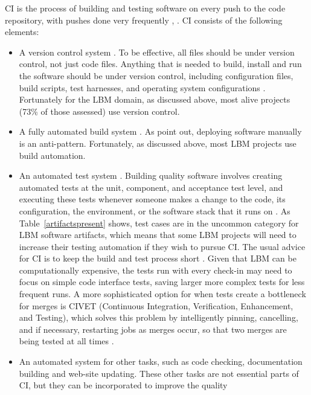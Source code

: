 \documentclass[final, 3p, times, authoryear]{elsarticle}
\begin{document}
CI is the process of building and testing software on every push to the code
repository, with pushes done very frequently \citep[p.\ 13]
{HumbleAndFarley2010}, \citep{ShahinEtAl2017, Fowler2006}.  CI consists of the
following elements:
\begin{itemize}
	\item A version control system \citep{Fowler2006}. To be effective, all
	files should be under version control, not just code files.  Anything that
	is needed to build, install and run the software should be under version
	control, including configuration files, build scripts, test harnesses, and
	operating system configurations \citep[p. 19]{HumbleAndFarley2010}.
	Fortunately for the LBM domain, as discussed above, most alive projects
	(73\% of those assessed) use version control.
	\item A fully automated build system \citep{Fowler2006}.  As \citet[p.\
	5]{HumbleAndFarley2010} point out, deploying software manually is an
	anti-pattern.  Fortunately, as discussed above, most LBM projects use build
	automation.
	\item An automated test system \citep{Fowler2006}. Building quality software
	involves creating automated tests at the unit, component, and acceptance
	test level, and executing these tests whenever someone makes a change to the
	code, its configuration, the environment, or the software stack that it runs
	on \citep[p.\ 83]{HumbleAndFarley2010}. As Table~\ref{artifactspresent}
	shows, test cases are in the uncommon category for LBM software artifacts,
	which means that some LBM projects will need to increase their testing
	automation if they wish to pursue CI.  The usual advice for CI is to keep
	the build and test process short \citep[p.\ 60]{HumbleAndFarley2010}. Given
	that LBM can be computationally expensive, the tests run with every check-in
	may need to focus on simple code interface tests, saving larger more complex
	tests for less frequent runs.  A more sophisticated option for when tests
	create a bottleneck for merges is CIVET (Continuous Integration,
	Verification, Enhancement, and Testing), which solves this problem by
	intelligently pinning, cancelling, and if necessary, restarting jobs as
	merges occur, so that two merges are being tested at all times
	\citep{SlaughterEtAl2021}.
	\item An automated system for other tasks, such as code checking,
	documentation building and web-site updating.  These other tasks are not
	essential parts of CI, but they can be incorporated to improve the quality

\end{itemize}
\end{document}
